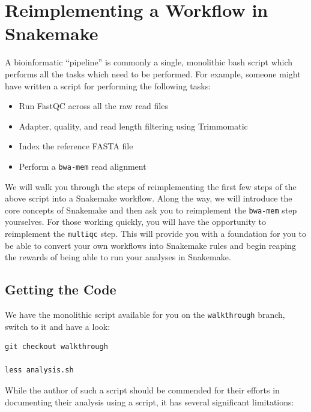 \section{Reimplementing a Workflow in Snakemake}

A bioinformatic ``pipeline'' is commonly a single, monolithic bash script which performs all the tasks which need
to be performed. For example, someone might have written a script for performing the following tasks:

\begin{itemize}
  \item Run FastQC across all the raw read files
  \item Adapter, quality, and read length filtering using Trimmomatic
  \item Index the reference FASTA file
  \item Perform a \texttt{bwa-mem} read alignment
\end{itemize}

We will walk you through the steps of reimplementing the first few steps of the above script into a Snakemake workflow. Along the way,
we will introduce the core concepts of Snakemake and then ask you to reimplement the \texttt{bwa-mem} step yourselves. For those
working quickly, you will have the opportunity to reimplement the \texttt{multiqc} step. This will provide you with a foundation
for you to be able to convert your own workflows into Snakemake rules and begin reaping the rewards of being able to run your analyses
in Snakemake.

\subsection{Getting the Code}

We have the monolithic script available for you on the \texttt{walkthrough} branch, switch to it and have a look:

\begin{lstlisting}
git checkout walkthrough

less analysis.sh
\end{lstlisting}

While the author of such a script should be commended for their efforts in documenting their analysis using a script,
it has several significant limitations:

